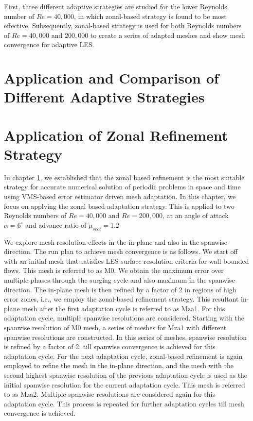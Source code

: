 First, three different adaptive strategies are studied for the lower Reynolds number of $Re=40,000$, in which zonal-based strategy is found to be most effective. Subsequently, zonal-based strategy is used for both Reynolds numbers of $Re=40,000$ and $200,000$ to create a series of adapted meshes and show mesh convergence for adaptive LES.


\section{Application and Comparison of Different Adaptive Strategies}
\label{sec:adaptive_strategy_comparison}




\section{Application of Zonal Refinement Strategy}


In chapter \ref{sec:adaptive_strategy_comparison}, we established that the zonal based refinement is the most suitable strategy for accurate numerical solution of periodic problems in space and time using VMS-based error estimator driven mesh adaptation. In this chapter, we focus on applying the zonal based adaptation strategy. This is applied to two Reynolds numbers of $Re=40,000$ and $Re=200,000$, at an angle of attack $\alpha=6^\circ$ and advance ratio of $\mu_{sect}=1.2$

We explore mesh resolution effects in the in-plane and also in the spanwise direction. 
The run plan to achieve mesh convergence is as follows. 
We start off with an initial mesh that satisfies LES surface resolution criteria for wall-bounded flows. This mesh is referred to as M0.
We obtain the maximum error over multiple phases through the surging cycle and also maximum in the spanwise direction.
The in-plane mesh is then refined by a factor of 2 in regions of high error zones, i.e., we employ the zonal-based refinement strategy.
This resultant in-plane mesh after the first adaptation cycle is referred to as Mza1.
For this adaptation cycle, multiple spanwise resolutions are considered. Starting with the spanwise resolution of M0 mesh, a series of meshes for Mza1 with different spanwise resolutions are constructed.
In this series of meshes, spanwise resolution is refined by a factor of 2, till spanwise convergence is achieved for this adaptation cycle. 
For the next adaptation cycle, zonal-based refinement is again employed to refine the mesh in the in-plane direction, and the mesh with the second highest spanwise resolution of the previous adaptation cycle is used as the initial spanwise resolution for the current adaptation cycle.
This mesh is referred to as Mza2.
Multiple spanwise resolutions are considered again for this adaptation cycle.
This process is repeated for further adaptation cycles till mesh convergence is achieved.

